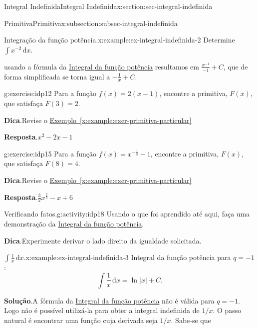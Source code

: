\documentclass[oneside,10pt,]{article}
\newcommand{\blocktitlefont}{\relax}
\newcommand{\xreffont}{\relax}
\numberwithin{equation}{section}
\newcommand{\dd}{\mathrm{d}}
\newcommand{\integral}[2]{\displaystyle\int {#1}\,\dd {#2}}
\begin{document}
\begin{sectionptx}{Integral Indefinida}{}{Integral Indefinida}{}{}{x:section:sec-integral-indefinida}
\begin{subsectionptx}{Primitiva}{}{Primitiva}{}{}{x:subsection:subsec-integral-indefinida}
\begin{example}{Integração da função potência.}{x:example:ex-integral-indefinida-2}
 Determine \(\integral{x^{-2}}{x}\).%
\par\smallskip%
\noindentNovamente usando a fórmula da \hyperref[x:assemblage:prob-integral-funcao-potencia]{Integral da função potência}  resultamos em \(\frac{x^{-1}}{-1} + C\), que de forma simplificada se torna igual a \(-\frac{1}{x} + C\).%
%
\end{example}
\begin{inlineexercise}{}{g:exercise:idp12}%
Para a função \(f(x)=2(x-1)\), encontre a primitiva, \(F(x)\), que satisfaça \(F(3)=2\).%
\par\smallskip%
\noindent\textbf{\blocktitlefont Dica}.\hypertarget{g:hint:idp13}{}\quad{}Revise o \hyperref[x:example:exer-primitiva-particular]{Exemplo~{\xreffont\ref{x:example:exer-primitiva-particular}}}%
\par\smallskip%
\noindent\textbf{\blocktitlefont Resposta}.\hypertarget{g:answer:idp14}{}\quad{}\(x^2-2x-1\)%
\end{inlineexercise}%
\begin{inlineexercise}{}{g:exercise:idp15}%
Para a função \(f(x)=x^{-\frac{1}{3}}-1\), encontre a primitiva, \(F(x)\), que satisfaça \(F(8)=4\).%
\par\smallskip%
\noindent\textbf{\blocktitlefont Dica}.\hypertarget{g:hint:idp16}{}\quad{}Revise o \hyperref[x:example:exer-primitiva-particular]{Exemplo~{\xreffont\ref{x:example:exer-primitiva-particular}}}%
\par\smallskip%
\noindent\textbf{\blocktitlefont Resposta}.\hypertarget{g:answer:idp17}{}\quad{}\(\frac{3}{2}  x^{\frac{2}{3}} - x + 6\)%
\end{inlineexercise}%
\begin{activity}{Verificando fatos.}{g:activity:idp18}%
Usando o que foi aprendido até aqui, faça uma demonstração da \hyperref[x:assemblage:prob-integral-funcao-potencia]{Integral da função potência}.%
\par\smallskip%
\noindent\textbf{\blocktitlefont Dica}.\hypertarget{g:hint:idp19}{}\quad{}Experimente derivar o lado direito da igualdade solicitada.%
\end{activity}%
\begin{example}{\(\integral{\frac{1}{x}}{x}\).}{x:example:ex-integral-indefinida-3}%
Integral da função potência para \(q=-1\):%
\begin{equation*}
\integral{\frac{1}{x}}{x} = \ln{|x|} + C\text{.}
\end{equation*}
%
\par\smallskip%
\noindent\textbf{\blocktitlefont Solução}.\hypertarget{g:solution:idp20}{}\quad{}A fórmula da \hyperref[x:assemblage:prob-integral-funcao-potencia]{Integral da função potência} não é válida para \(q=-1\). Logo não é possível utilizá-la para obter a integral indefinida de \(1/x\). O passo natural é encontrar uma função cuja derivada seja \(1/x\). Sabe-se que%

\end{example}
\end{subsectionptx}
\end{sectionptx}
\end{document}
